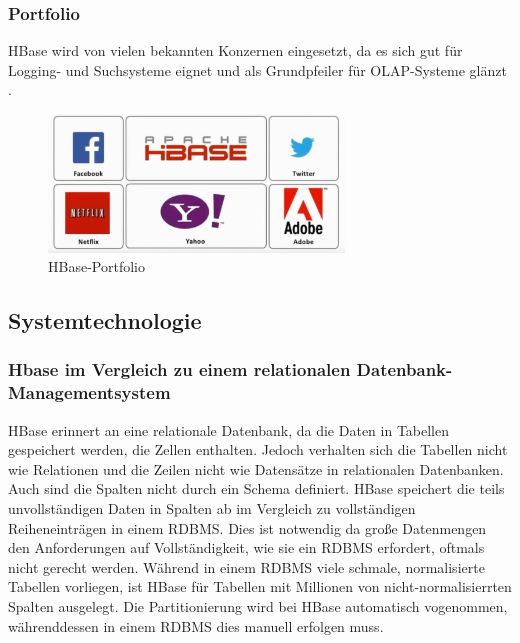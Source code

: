 

\subsubsection{Portfolio}
HBase wird von vielen bekannten Konzernen eingesetzt, da es sich gut für Logging- und Suchsysteme  eignet und als Grundpfeiler für \ac{OLAP}-Systeme glänzt \cite{Redt01}.

\begin{figure}[htbp] 
  \centering
     \includegraphics[width=0.7\textwidth]{images/portfolio.png}
  \caption{HBase-Portfolio}
  \label{fig:Portfolio}
\end{figure}

\subsection{Systemtechnologie}




\subsubsection{Hbase im Vergleich zu einem relationalen Datenbank-Managementsystem}
HBase erinnert an eine relationale Datenbank, da die Daten in Tabellen gespeichert werden, die Zellen enthalten. Jedoch verhalten sich die Tabellen nicht wie Relationen und die Zeilen nicht wie Datensätze in relationalen Datenbanken. Auch sind die Spalten nicht durch ein Schema definiert.
HBase speichert die teils unvollständigen Daten in Spalten ab im Vergleich zu vollständigen Reiheneinträgen in einem RDBMS. Dies ist notwendig da große Datenmengen den Anforderungen auf Vollständigkeit, wie sie ein RDBMS erfordert, oftmals nicht gerecht werden.  
Während in einem RDBMS viele schmale, normalisierte Tabellen vorliegen, ist HBase für Tabellen mit Millionen von nicht-normalisierrten Spalten ausgelegt. Die Partitionierung wird bei HBase automatisch vogenommen, währenddessen in einem RDBMS dies manuell erfolgen muss.


